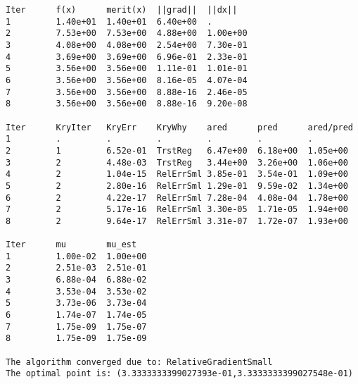 \begin{lstlisting}[style=peoptOutput,caption={Output generated by PEOpt when running the simple inequality example.  We explain this output in Chapter \ref{ch:Output}.},label=lst:simpleIneqOut]
Iter      f(x)      merit(x)  ||grad||  ||dx||    
1         1.40e+01  1.40e+01  6.40e+00  .         
2         7.53e+00  7.53e+00  4.88e+00  1.00e+00  
3         4.08e+00  4.08e+00  2.54e+00  7.30e-01  
4         3.69e+00  3.69e+00  6.96e-01  2.33e-01  
5         3.56e+00  3.56e+00  1.11e-01  1.01e-01  
6         3.56e+00  3.56e+00  8.16e-05  4.07e-04  
7         3.56e+00  3.56e+00  8.88e-16  2.46e-05  
8         3.56e+00  3.56e+00  8.88e-16  9.20e-08  

Iter      KryIter   KryErr    KryWhy    ared      pred      ared/pred 
1         .         .         .         .         .         .         
2         1         6.52e-01  TrstReg   6.47e+00  6.18e+00  1.05e+00  
3         2         4.48e-03  TrstReg   3.44e+00  3.26e+00  1.06e+00  
4         2         1.04e-15  RelErrSml 3.85e-01  3.54e-01  1.09e+00  
5         2         2.80e-16  RelErrSml 1.29e-01  9.59e-02  1.34e+00  
6         2         4.22e-17  RelErrSml 7.28e-04  4.08e-04  1.78e+00  
7         2         5.17e-16  RelErrSml 3.30e-05  1.71e-05  1.94e+00  
8         2         9.64e-17  RelErrSml 3.31e-07  1.72e-07  1.93e+00 

Iter      mu        mu_est    
1         1.00e-02  1.00e+00  
2         2.51e-03  2.51e-01  
3         6.88e-04  6.88e-02  
4         3.53e-04  3.53e-02  
5         3.73e-06  3.73e-04  
6         1.74e-07  1.74e-05  
7         1.75e-09  1.75e-07  
8         1.75e-09  1.75e-09  

The algorithm converged due to: RelativeGradientSmall
The optimal point is: (3.3333333399027393e-01,3.3333333399027548e-01)
\end{lstlisting}
